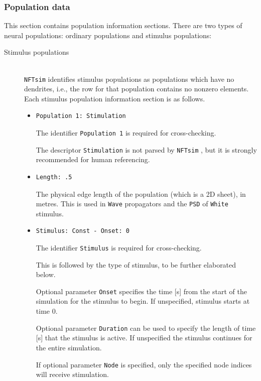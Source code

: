 \documentclass[12pt,a4paper]{article}
\newcommand{\type}[1]{{\small\small\tt #1} }
\newcommand{\NF}[0]{\type{NFTsim}}
\begin{document}
\subsubsection{Population data}
\label{sec:pop_conf}
This section contains population information sections. There are two types of neural populations: ordinary populations and stimulus populations:
\begin{description}

\item[Stimulus populations]\ \\

\NF identifies stimulus populations as populations which have no dendrites, i.e., the row for that population contains no nonzero elements.  Each stimulus population information section is as follows.
\begin{itemize}
    \item \begin{lstlisting}
Population 1: Stimulation
    \end{lstlisting}
    The identifier \type{Population 1} is required for cross-checking.

    The descriptor \type{Stimulation} is not parsed by \NF, but it is strongly recommended for human referencing.
    \item
    \begin{lstlisting}
Length: .5
    \end{lstlisting}
    The physical edge length of the population (which is a 2D sheet), in metres. This is used in \type{Wave} propagators and the \type{PSD} of \type{White} stimulus.
    \item
    \begin{lstlisting}
Stimulus: Const - Onset: 0
    \end{lstlisting}
    The identifier \type{Stimulus} is required for cross-checking.

    This is followed by the type of stimulus, to be further elaborated below.

    Optional parameter \type{Onset} specifies the time [s] from the start of the simulation for the stimulus to begin. If unspecified, stimulus starts at time 0.

    Optional parameter \type{Duration} can be used to specify the length of time [s] that the stimulus is active. If unspecified the stimulus continues for the entire simulation.

    If optional parameter \type{Node} is specified, only the specified node indices will receive stimulation.


\end{itemize}
\end{description}
\end{document}
